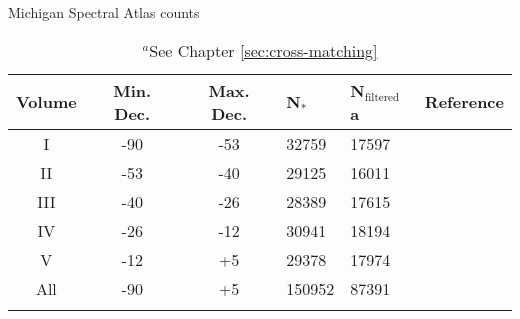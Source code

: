 \begin{table}[t]
    \footnotesize
    \centering
    \caption{Michigan Spectral Atlas counts}
    \begin{tabular}{cccllc}
    \toprule
    Volume & Min. Dec. & Max. Dec. & N$_{*}$ & N$_{\mbox{filtered}}$a & Reference \\ \midrule
    I & -90 & -53 & 32759 & 17597 & \citet{Houk1975} \\
    II & -53 & -40 & 29125 & 16011 & \citet{Houk1978} \\
    III & -40 & -26 & 28389 & 17615 & \citet{Houk1982} \\
    IV & -26 & -12 & 30941 & 18194 & \citet{Houk1988} \\
    V & -12 & +5 & 29378 & 17974 & \citet{Houk1999} \\
    All & -90 & +5 & 150952 & 87391 & \\
    \bottomrule
    \addlinespace[10pt]
    \end{tabular}
    \caption*{$^{a}$See Chapter \ref{sec:cross-matching}}
    \label{table:michigan_pops}
\end{table}

